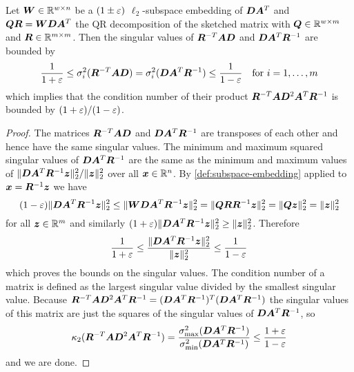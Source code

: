 \begin{theorem} \label{thm:condition-number-bound}
Let \(\bm{W} \in \mathbb{R}^{w \times n}\) be a \((1 \pm \varepsilon)\) \(\ell_2\)-subspace embedding of \(\bm{D}\bm{A}^T\) and \(\bm{Q}\bm{R} = \bm{W}\bm{D}\bm{A}^T\) the QR decomposition of the sketched matrix with \(\bm{Q} \in \mathbb{R}^{w \times m}\) and \(\bm{R} \in \mathbb{R}^{m \times m}\). Then the singular values of \(\bm{R}^{-T}\bm{A}\bm{D}\) and \(\bm{D}\bm{A}^T \bm{R}^{-1}\) are bounded by
\[ \frac{1}{1 + \varepsilon} \leq \sigma_i^2(\bm{R}^{-T}\bm{A}\bm{D}) = \sigma_i^2(\bm{D}\bm{A}^T \bm{R}^{-1}) \leq \frac{1}{1 - \varepsilon} \quad \text{for } i = 1, \ldots, m \]
which implies that the condition number of their product \(\bm{R}^{-T} \bm{A} \bm{D}^2 \bm{A}^T \bm{R}^{-1}\) is bounded by \((1+\varepsilon) / (1-\varepsilon)\).
\end{theorem}
\begin{proof}
The matrices \(\bm{R}^{-T}\bm{A}\bm{D}\) and \(\bm{D}\bm{A}^T \bm{R}^{-1}\) are transposes of each other and hence have the same singular values.
The minimum and maximum squared singular values of \(\bm{D}\bm{A}^T \bm{R}^{-1}\) are the same as the minimum and maximum values of \( \lVert \bm{D}\bm{A}^T \bm{R}^{-1} \bm{z} \rVert_2^2 / \lVert \bm{z} \rVert_2^2\) over all \(\bm{x} \in \mathbb{R}^n\).
By \cref{def:subspace-embedding} applied to \(\bm{x} = \bm{R}^{-1} \bm{z}\) we have
\[
  (1-\varepsilon) \lVert \bm{D}\bm{A}^T \bm{R}^{-1} \bm{z} \rVert_2^2
  \leq \lVert \bm{W}\bm{D}\bm{A}^T \bm{R}^{-1}\bm{z} \rVert_2^2
  = \lVert \bm{Q}\bm{R} \bm{R}^{-1}\bm{z} \rVert_2^2
  = \lVert \bm{Q}\bm{z} \rVert_2^2
  = \lVert \bm{z} \rVert_2^2
\]
for all \(\bm{z} \in \mathbb{R}^m\) and similarly \((1+\varepsilon)\lVert \bm{D}\bm{A}^T \bm{R}^{-1} \bm{z} \rVert_2^2 \geq \lVert \bm{z} \rVert_2^2\).
Therefore
\[ \frac{1}{1 + \varepsilon} \leq \frac{\lVert \bm{D}\bm{A}^T \bm{R}^{-1} \bm{z} \rVert_2^2}{\lVert \bm{z} \rVert_2^2} \leq \frac{1}{1 - \varepsilon} \]
which proves the bounds on the singular values.
The condition number of a matrix is defined as the largest singular value divided by the smallest singular value.
Because \(\bm{R}^{-T} \bm{A} \bm{D}^2 \bm{A}^T \bm{R}^{-1} = (\bm{D} \bm{A}^T \bm{R}^{-1})^T (\bm{D} \bm{A}^T \bm{R}^{-1})\) the singular values of this matrix are just the squares of the singular values of \(\bm{D} \bm{A}^T \bm{R}^{-1}\), so
\[ \kappa_2(\bm{R}^{-T} \bm{A} \bm{D}^2 \bm{A}^T \bm{R}^{-1})
   = \frac{\sigma_{\max}^2(\bm{D} \bm{A}^T \bm{R}^{-1})}{\sigma_{\min}^2(\bm{D} \bm{A}^T \bm{R}^{-1})} \leq \frac{1+\varepsilon}{1-\varepsilon} \]
and we are done.
\end{proof}

